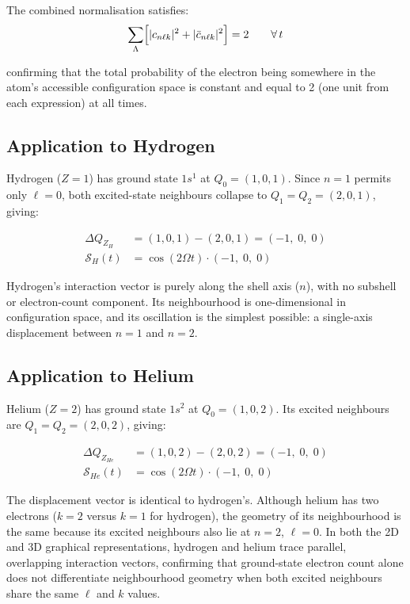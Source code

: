 \documentclass[12pt, a4paper]{article}
\newcommand{\Int}{\mathcal{S}}           %
\newcommand{\Lattice}{\Lambda}           %
\newcommand{\DQ}{\Delta Q_{Z}}          %
\begin{document}
The combined normalisation satisfies:
\begin{equation}
  \sum_{\Lattice}\Bigl[|c_{n\ell k}|^2 + |\bar{c}_{n\ell k}|^2\Bigr] = 2
  \qquad \forall\, t
  \label{eq:normalisation}
\end{equation}

confirming that the total probability of the electron being somewhere in the atom's
accessible configuration space is constant and equal to 2 (one unit from each expression)
at all times.

\subsection{Application to Hydrogen}

Hydrogen ($Z=1$) has ground state $1s^1$ at $Q_0=(1,0,1)$. Since $n=1$ permits only
$\ell=0$, both excited-state neighbours collapse to $Q_1=Q_2=(2,0,1)$, giving:

\begin{align}
  \DQ_H &= (1,0,1) - (2,0,1) = (-1,\;0,\;0) \\[4pt]
  \Int_H(t) &= \cos(2\Omega t)\cdot(-1,\;0,\;0)
\end{align}

Hydrogen's interaction vector is purely along the shell axis ($n$), with no subshell or
electron-count component. Its neighbourhood is one-dimensional in configuration space,
and its oscillation is the simplest possible: a single-axis displacement between $n=1$
and $n=2$.

\subsection{Application to Helium}

Helium ($Z=2$) has ground state $1s^2$ at $Q_0=(1,0,2)$. Its excited neighbours are
$Q_1=Q_2=(2,0,2)$, giving:

\begin{align}
  \DQ_{He} &= (1,0,2) - (2,0,2) = (-1,\;0,\;0) \\[4pt]
  \Int_{He}(t) &= \cos(2\Omega t)\cdot(-1,\;0,\;0)
\end{align}

The displacement vector is identical to hydrogen's. Although helium has two electrons
($k=2$ versus $k=1$ for hydrogen), the geometry of its neighbourhood is the same because
its excited neighbours also lie at $n=2$, $\ell=0$. In both the 2D and 3D graphical
representations, hydrogen and helium trace parallel, overlapping interaction vectors,
confirming that ground-state electron count alone does not differentiate neighbourhood
geometry when both excited neighbours share the same $\ell$ and $k$ values.
\end{document}
